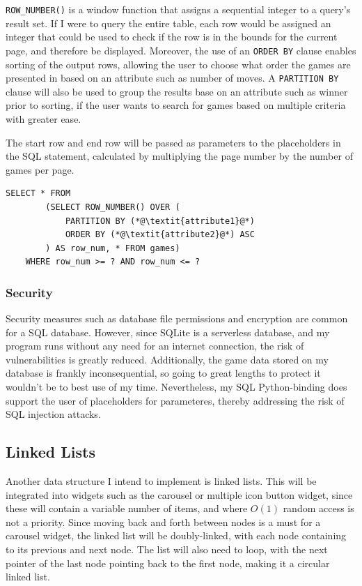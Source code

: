 \documentclass[../main/main.tex]{subfiles}
\begin{document}
\lstinline[language=sqlite]{ROW_NUMBER()} is a window function that assigns a sequential integer to a query's result set. If I were to query the entire table, each row would be assigned an integer that could be used to check if the row is in the bounds for the current page, and therefore be displayed. Moreover, the use of an \lstinline[language=sqlite]{ORDER BY} clause enables sorting of the output rows, allowing the user to choose what order the games are presented in based on an attribute such as number of moves. A \lstinline[language=sqlite]{PARTITION BY} clause will also be used to group the results base on an attribute such as winner prior to sorting, if the user wants to search for games based on multiple criteria with greater ease.

The start row and end row will be passed as parameters to the placeholders in the SQL statement, calculated by multiplying the page number by the number of games per page.

\begin{lstlisting}[language=sqlite, frame=lines]
    SELECT * FROM
        (SELECT ROW_NUMBER() OVER (
            PARTITION BY (*@\textit{attribute1}@*)
            ORDER BY (*@\textit{attribute2}@*) ASC
        ) AS row_num, * FROM games)
    WHERE row_num >= ? AND row_num <= ?
\end{lstlisting}

\subsubsection*{Security}
Security measures such as database file permissions and encryption are common for a SQL database. However, since SQLite is a serverless database, and my program runs without any need for an internet connection, the risk of vulnerabilities is greatly reduced. Additionally, the game data stored on my database is frankly inconsequential, so going to great lengths to protect it wouldn't be to best use of my time. Nevertheless, my SQL Python-binding does support the user of placeholders for parameteres, thereby addressing the risk of SQL injection attacks.

\subsection{Linked Lists}
\label{sec:linked-lists}
Another data structure I intend to implement is linked lists. This will be integrated into widgets such as the carousel or multiple icon button widget, since these will contain a variable number of items, and where $O(1)$ random access is not a priority. Since moving back and forth between nodes is a must for a carousel widget, the linked list will be doubly-linked, with each node containing to its previous and next node. The list will also need to loop, with the next pointer of the last node pointing back to the first node, making it a circular linked list.
\end{document}

